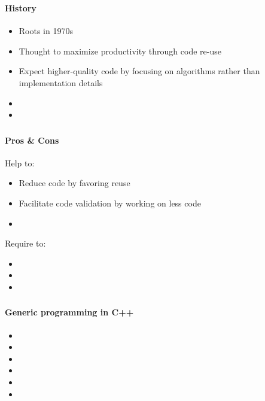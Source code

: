 \documentclass[draft]{beamer}
\DeclareRobustCommand{\todo}[1]{\ifdraft{\textbf{\textcolor{red}{[#1]}}}{}}
\begin{document}
\begin{frame}[allowframebreaks]
\frametitle{\cite{giovannelli_programming_2013}}
\framesubtitle{History}
\begin{itemize}
 \item Roots in 1970s
 \item Thought to maximize productivity through code re-use 
 \item Expect higher-quality code by focusing on algorithms rather than implementation details
 \item 
 \item 
\end{itemize}
\end{frame}

\begin{frame}
\frametitle{\cite{giovannelli_programming_2013}}
\framesubtitle{Pros \& Cons}
\begin{exampleblock}{Help to:}
 \begin{itemize}
  \item Reduce code by favoring reuse
  \item Facilitate code validation by working on less code
  \item \todo{Me: Establish conventions by using the same code where applicable}
 \end{itemize}
\end{exampleblock}
\begin{alertblock}{Require to:}
 \begin{itemize}
  \item \todo{Me: Abstract from data specifics (e.g. type)}
  \item \todo{Me: Favor general practices}
  \item \todo{Me: Master the domain to be modeled}
 \end{itemize}
\end{alertblock}
\end{frame}

\begin{frame}
\frametitle{\cite{giovannelli_programming_2013}}
\framesubtitle{Generic programming in C++}
\begin{itemize}
 \item 
 \item 
 \item 
 \item 
 \item 
 \item 
\end{itemize}
\end{frame}
\end{document}
